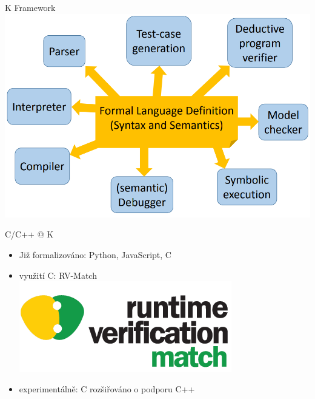 \documentclass[11pt]{beamer}
\begin{document}
% 

\begin{frame}{K Framework}
\includegraphics[width=1.0\linewidth]{img/kidea.png}
\end{frame}

\begin{frame}{C/C++ @ K}
\begin{itemize}
\item Již formalizováno: Python, JavaScript, C
\pause \item využití C: RV-Match \\
\includegraphics[width=0.3\linewidth]{img/rvmatch.png}
\pause \item experimentálně: C rozšiřováno o podporu C++
\end{itemize}
\end{frame}
\end{document}
